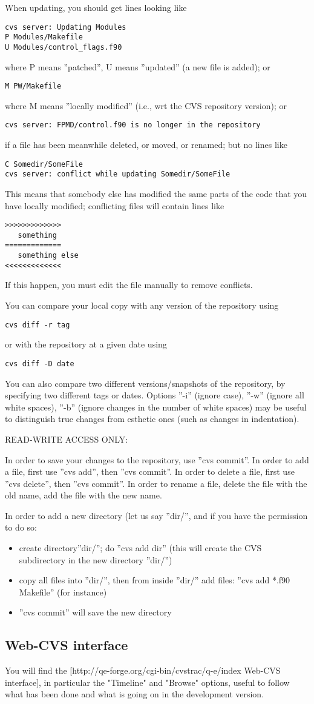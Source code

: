 \documentclass[12pt,a4paper]{article}
\begin{document}
When updating, you should get lines looking like
\begin{verbatim}
cvs server: Updating Modules
P Modules/Makefile
U Modules/control_flags.f90
\end{verbatim}
where P means ''patched'', U means ''updated'' (a new file is added); or
\begin{verbatim}
M PW/Makefile
\end{verbatim}
where M means ''locally modified'' (i.e., wrt the CVS repository
version); or
\begin{verbatim}
cvs server: FPMD/control.f90 is no longer in the repository
\end{verbatim}
if a file has been meanwhile deleted, or moved, or renamed; but no lines like
\begin{verbatim}
C Somedir/SomeFile
cvs server: conflict while updating Somedir/SomeFile
\end{verbatim}
This means that somebody else has modified the same parts of the code that you have locally modified; conflicting files will contain lines like
\begin{verbatim}
>>>>>>>>>>>>>
   something
=============
   something else
<<<<<<<<<<<<<
\end{verbatim}
If this happen, you must edit the file manually to remove conflicts.

You can compare your local copy with any version of the repository
using
\begin{verbatim}
cvs diff -r tag
\end{verbatim}
or with the repository at a given date using
\begin{verbatim}
cvs diff -D date
\end{verbatim}
You can also compare two different versions/snapshots of the repository, by specifying two different tags or dates. Options ''-i'' (ignore case), ''-w'' (ignore all white spaces), ''-b'' (ignore changes in the number of white spaces) may be useful to distinguish true changes from esthetic ones (such as changes in indentation).

READ-WRITE ACCESS ONLY:

In order to save your changes to the repository, use ''cvs commit''. In order to add a file, first use ''cvs add'', then ''cvs commit''. In order to delete a file, first use ''cvs delete'', then ''cvs commit''. In order to rename a file, delete the file with the old name, add the file with the new name.

In order to add a new directory (let us say ''dir/'', and if you have the permission to do so:
\begin{itemize}
\item create directory''dir/''; do ''cvs add dir'' (this will create the CVS subdirectory in the new directory ''dir/'')
\item copy all files into ''dir/'', then from inside ''dir/'' add files: ''cvs add *.f90 Makefile'' (for instance)
\item ''cvs commit'' will save the new directory
\end{itemize}

\subsection{Web-CVS interface}

You will find the
[http://qe-forge.org/cgi-bin/cvstrac/q-e/index Web-CVS interface], in particular the "Timeline"
and "Browse" options, useful to follow what has been done and what is going on in the
development version.
\end{document}
